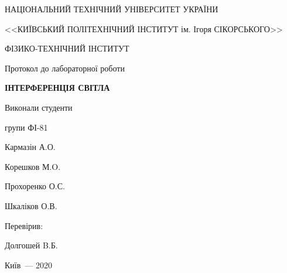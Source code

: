 \thispagestyle{empty}

\begin{center}
НАЦІОНАЛЬНИЙ ТЕХНІЧНИЙ УНІВЕРСИТЕТ УКРАЇНИ \par
<<КИЇВСЬКИЙ ПОЛІТЕХНІЧНИЙ ІНСТИТУТ ім. Ігоря СІКОРСЬКОГО>>\par
ФІЗИКО-ТЕХНІЧНИЙ ІНСТИТУТ\par

\vspace{5cm}
{\huge Протокол до лабораторної роботи\par}

\huge\MakeUppercase{\textbf{ Інтерференція світла }} \par
\end{center}

\vspace{3cm}
\begin{flushright}
Виконали студенти 

групи ФІ-81

\bigbreak

Кармазін А.О.

Корешков М.O.

Прохоренко О.С.

Шкаліков О.В.

\vspace{20mm}
Перевірив:

Долгошей B.Б.

\end{flushright}

\vspace{6cm}
\begin{center}
{Київ~--- 2020}
\end{center}

\newpage
